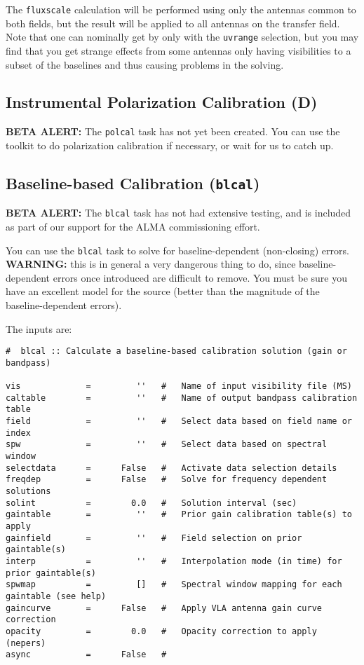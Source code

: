 The {\tt fluxscale} calculation will be performed using only the
antennas common 
to both fields, but the result will be applied to all antennas on the
transfer field.  Note that one can nominally get by only with the
{\tt uvrange} selection, but you may find that you get strange
effects from some antennas only having visibilities to a subset of
the baselines and thus causing problems in the solving.

\subsection{Instrumental Polarization Calibration (D)}
\label{section:cal.solve.pol}

{\bf BETA ALERT:} The {\tt polcal} task has not yet been created.  You
can use the toolkit to do polarization calibration if necessary, or
wait for us to catch up.

\subsection{Baseline-based Calibration ({\tt blcal})}
\label{section:cal.solve.blcal}

{\bf BETA ALERT:} The {\tt blcal} task has not had extensive testing,
and is included as part of our support for the ALMA commissioning
effort.

You can use the {\tt blcal} task to solve for baseline-dependent
(non-closing) errors.  {\bf WARNING:} this is in general a very dangerous
thing to do, since baseline-dependent errors once introduced are
difficult to remove.  You must be sure you have an excellent model
for the source (better than the magnitude of the baseline-dependent
errors).

The inputs are:
\small
\begin{verbatim}
#  blcal :: Calculate a baseline-based calibration solution (gain or bandpass)

vis             =         ''   #   Name of input visibility file (MS)
caltable        =         ''   #   Name of output bandpass calibration table
field           =         ''   #   Select data based on field name or index
spw             =         ''   #   Select data based on spectral window
selectdata      =      False   #   Activate data selection details
freqdep         =      False   #   Solve for frequency dependent solutions
solint          =        0.0   #   Solution interval (sec)
gaintable       =         ''   #   Prior gain calibration table(s) to apply
gainfield       =         ''   #   Field selection on prior gaintable(s)
interp          =         ''   #   Interpolation mode (in time) for prior gaintable(s)
spwmap          =         []   #   Spectral window mapping for each gaintable (see help)
gaincurve       =      False   #   Apply VLA antenna gain curve correction
opacity         =        0.0   #   Opacity correction to apply (nepers)
async           =      False   #   
\end{verbatim}
\normalsize

